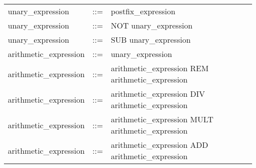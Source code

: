 \begin{longtable}{lrl}
unary\_expression                          & ::= &
  \begin{minipage}[t]{\rulerhs}
    \raggedright
    postfix\_expression
  \end{minipage}                                                             \\
unary\_expression                          & ::= &
  \begin{minipage}[t]{\rulerhs}
    \raggedright
    NOT unary\_expression
  \end{minipage}                                                             \\
unary\_expression                          & ::= &
  \begin{minipage}[t]{\rulerhs}
    \raggedright
    SUB unary\_expression
  \end{minipage}                                                             \\
arithmetic\_expression                     & ::= &
  \begin{minipage}[t]{\rulerhs}
    \raggedright
    unary\_expression
  \end{minipage}                                                             \\
arithmetic\_expression                     & ::= &
  \begin{minipage}[t]{\rulerhs}
    \raggedright
    arithmetic\_expression REM arithmetic\_expression
  \end{minipage}                                                             \\
arithmetic\_expression                     & ::= &
  \begin{minipage}[t]{\rulerhs}
    \raggedright
    arithmetic\_expression DIV arithmetic\_expression
  \end{minipage}                                                             \\
arithmetic\_expression                     & ::= &
  \begin{minipage}[t]{\rulerhs}
    \raggedright
    arithmetic\_expression MULT arithmetic\_expression
  \end{minipage}                                                             \\
arithmetic\_expression                     & ::= &
  \begin{minipage}[t]{\rulerhs}
    \raggedright
    arithmetic\_expression ADD arithmetic\_expression
  \end{minipage}                                                             \\

\end{longtable}
